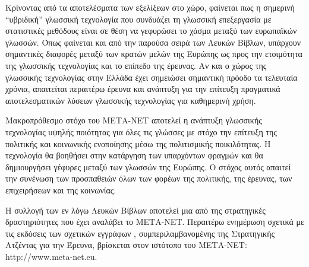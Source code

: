 \begin{multicols}{2}

Κρίνοντας από τα αποτελέσματα των εξελίξεων στο χώρο, φαίνεται πως η σημερινή ``υβριδική'' γλωσσική τεχνολογία που συνδυάζει τη γλωσσική επεξεργασία με στατιστικές μεθόδους είναι σε θέση να γεφυρώσει το χάσμα μεταξύ των ευρωπαϊκών γλωσσών. Όπως φαίνεται και από την παρούσα σειρά των Λευκών Βίβλων, υπάρχουν σημαντικές διαφορές μεταξύ των κρατών μελών της Ευρώπης ως προς την ετοιμότητα της γλωσσικής τεχνολογίας και το επίπεδο της έρευνας. Αν και ο χώρος της γλωσσικής τεχνολογίας στην Ελλάδα έχει σημειώσει σημαντική πρόοδο τα τελευταία χρόνια, απαιτείται περαιτέρω έρευνα και ανάπτυξη για την επίτευξη πραγματικά αποτελεσματικών λύσεων γλωσσικής τεχνολογίας για καθημερινή χρήση. 

Μακροπρόθεσμο στόχο του ΜΕΤΑ-ΝΕΤ αποτελεί η ανάπτυξη γλωσσικής τεχνολογίας υψηλής ποιότητας για όλες τις γλώσσες με στόχο την επίτευξη της πολιτικής και κοινωνικής ενοποίησης μέσω της πολιτισμικής ποικιλότητας. Η τεχνολογία θα βοηθήσει στην κατάργηση των υπαρχόντων φραγμών και θα δημιουργήσει γέφυρες μεταξύ των γλωσσών της Ευρώπης. Ο στόχος αυτός απαιτεί  την συνένωση των προσπαθειών όλων των φορέων της πολιτικής, της έρευνας, των επιχειρήσεων και της κοινωνίας.

Η συλλογή των εν λόγω Λευκών Βίβλων αποτελεί μια από της στρατηγικές δραστηριότητες που έχει αναλάβει το ΜΕΤΑ-ΝΕΤ. Περαιτέρω ενημέρωση σχετικά με τις εκδόσεις των σχετικών εγγράφων \cite{Meta1},  συμπεριλαμβανομένης της Στρατηγικής Ατζέντας για την Έρευνα, βρίσκεται στον ιστότοπο του ΜΕΤΑ-ΝΕΤ: http://www.meta-net.eu.
\end{multicols}

\clearpage



